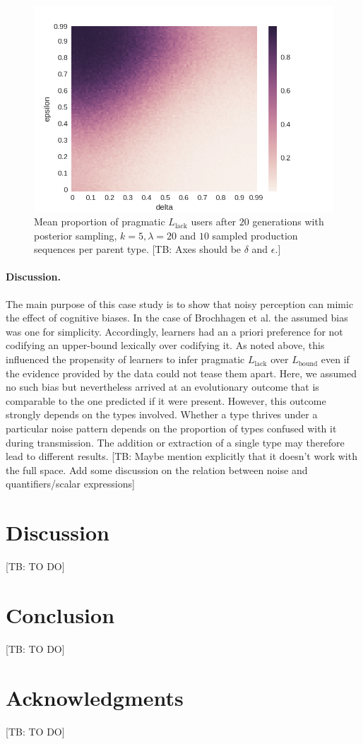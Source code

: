 \documentclass[10pt,a4paper]{article}
\newcommand{\tb}[1]{\textcolor[rgb]{.8,.33,.0}{[TB: #1]}}%
\begin{document}
\begin{figure}[ht]
\centering
    \includegraphics[scale=0.5]{../code/plots/quantifiers-posterior-sampling-k5.png}
  \caption{Mean proportion of pragmatic $L_{\text{lack}}$ users after $20$ generations with posterior sampling, $k = 5, \lambda = 20$ and $10$ sampled production sequences per parent type. \tb{Axes should be $\delta$ and $\epsilon$.}}
  \label{fig:quant}
\end{figure}


\paragraph{Discussion.} The main purpose of this case study is to show that noisy perception can mimic the effect of cognitive biases. In the case of Brochhagen et al. the assumed bias was one for simplicity. Accordingly, learners had an a priori preference for not codifying an upper-bound lexically over codifying it. As noted above, this influenced the propensity of learners to infer pragmatic $L_{\text{lack}}$ over $L_{\text{bound}}$ even if the evidence provided by the data could not tease them apart. Here, we assumed no such bias but nevertheless arrived at an evolutionary outcome that is comparable to the one predicted if it were present. However, this outcome strongly depends on the types involved. Whether a type thrives under a particular noise pattern depends on the proportion of types confused with it during transmission. The addition or extraction of a single type may therefore lead to different results. \tb{Maybe mention explicitly that it doesn't work with the full space. Add some discussion on the relation between noise and quantifiers/scalar expressions}


\section{Discussion}
\tb{TO DO} 

\section{Conclusion}
\tb{TO DO}

\section{Acknowledgments}
\tb{TO DO}




\setlength{\bibleftmargin}{.125in}
\setlength{\bibindent}{-\bibleftmargin}


\end{document}
